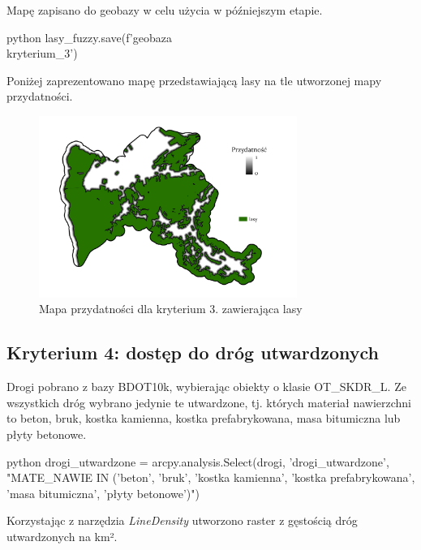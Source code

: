 \documentclass{article}
\begin{document}
Mapę zapisano do geobazy w celu użycia w późniejszym etapie.
\vspace{5pt}

\begin{mintedbox}{python}
lasy_fuzzy.save(f'{geobaza}\\kryterium_3')
\end{mintedbox}
\vspace{10pt}

Poniżej zaprezentowano mapę przedstawiającą lasy na tle utworzonej mapy przydatności.

\begin{figure}[H]
    \centering
    \includegraphics[width=0.75\textwidth]{img/kryterium3-lasy.jpg}
    \caption{Mapa przydatności dla kryterium 3. zawierająca lasy}
\end{figure}
\vspace{10pt}


\subsection{Kryterium 4: dostęp do dróg utwardzonych}
Drogi pobrano z bazy BDOT10k, wybierając obiekty o klasie OT\_SKDR\_L. Ze wszystkich dróg wybrano jedynie te utwardzone, tj. których materiał nawierzchni to beton, bruk, kostka kamienna, kostka prefabrykowana, masa bitumiczna lub płyty betonowe.
\vspace{5pt}

\begin{mintedbox}{python}
drogi_utwardzone = arcpy.analysis.Select(drogi, 'drogi_utwardzone', "MATE_NAWIE IN ('beton', 'bruk', 'kostka kamienna', 'kostka prefabrykowana', 'masa bitumiczna', 'płyty betonowe')")
\end{mintedbox}
\vspace{10pt}

Korzystając z narzędzia \textit{LineDensity} utworzono raster z gęstością dróg utwardzonych na km².
\vspace{5pt}
\end{document}
